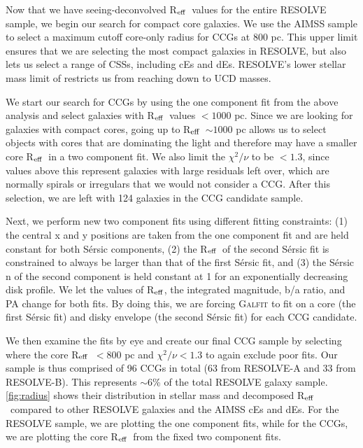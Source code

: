 \documentclass[iop,apj]{emulateapj}
\newcommand{\Reff}{R$_{\rm eff}$}
\begin{document}
\noindent Now that we have seeing-deconvolved \Reff\ values for the entire RESOLVE sample, we begin our search for compact core galaxies. We use the AIMSS sample to select a maximum cutoff core-only radius for CCGs at 800 pc. This upper limit ensures that we are selecting the most compact galaxies in RESOLVE, but also lets us select a range of CSSs, including cEs and dEs. RESOLVE's lower stellar mass limit of  restricts us from reaching down to UCD masses.

We start our search for CCGs by using the one component fit from the above analysis and select galaxies with \Reff\ values $<1000$ pc. Since we are looking for galaxies with compact cores, going up to \Reff\ $\sim 1000$ pc allows us to select objects with cores that are dominating the light and therefore may have a smaller core \Reff\ in a two component fit. We also limit the  $\chi^2/\nu$ to be $<1.3$, since values above this represent galaxies with large residuals left over, which are normally spirals or irregulars that we would not consider a CCG. After this selection, we are left with 124 galaxies in the CCG candidate sample.

Next, we perform new two component fits using different fitting constraints: (1) the central x and y positions are taken from the one component fit and are held constant for both S\'ersic components, (2) the \Reff\ of the second S\'ersic fit is constrained to always be larger than that of the first S\'ersic fit, and (3) the S\'ersic n of the second component is held constant at 1 for an exponentially decreasing disk profile. We let the values of \Reff, the integrated magnitude, b/a ratio, and PA change for both fits. By doing this, we are forcing \textsc{Galfit} to fit on a core (the first S\'ersic fit) and disky envelope (the second S\'ersic fit) for each CCG candidate.

We then examine the fits by eye and create our final CCG sample by selecting where the core \Reff\ $< 800$ pc and $\chi^2/\nu < 1.3$ to again exclude poor fits. Our sample is thus comprised of 96 CCGs in total (63 from RESOLVE-A and 33 from RESOLVE-B). This represents $\sim6$\% of the total RESOLVE galaxy sample. \autoref{fig:radius} shows their distribution in stellar mass and decomposed \Reff\ compared to other RESOLVE galaxies and the AIMSS cEs and dEs. For the RESOLVE sample, we are plotting the one component fits, while for the CCGs, we are plotting the core \Reff\ from the fixed two component fits. 
\end{document}
